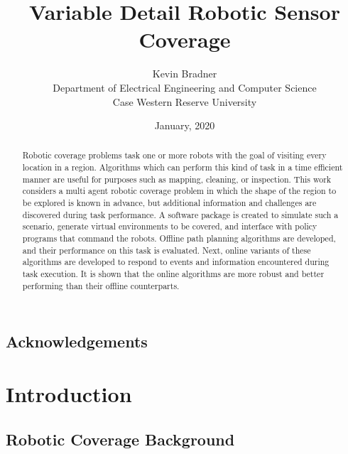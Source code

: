 \documentclass[letterpaper, 12pt, leqno]{report}
\begin{document}

\title{Variable Detail Robotic Sensor Coverage}

\author{Kevin Bradner\\Department of Electrical Engineering and Computer Science\\Case Western Reserve University}
\date{January, 2020}
\maketitle

\tableofcontents

\listoftables

\listoffigures

\section*{Acknowledgements}

\begin{abstract}
Robotic coverage problems task one or more robots with the goal of visiting every location in a region. Algorithms which can perform this kind of task in a time efficient manner are useful for purposes such as mapping, cleaning, or inspection. This work considers a multi agent robotic coverage problem in which the shape of the region to be explored is known in advance, but additional information and challenges are discovered during task performance. A software package is created to simulate such a scenario, generate virtual environments to be covered, and interface with policy programs that command the robots. Offline path planning algorithms are developed, and their performance on this task is evaluated. Next, online variants of these algorithms are developed to respond to events and information encountered during task execution. It is shown that the online algorithms are more robust and better performing than their offline counterparts.
\end{abstract}


\chapter{Introduction}

\section{Robotic Coverage Background}
\end{document}

